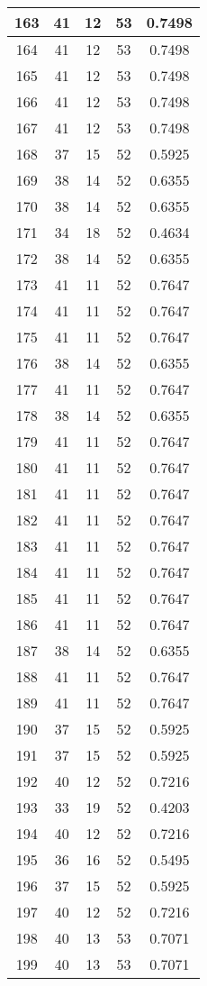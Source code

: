 \documentclass[letterpaper, 12pt]{article}
\begin{document}
\begin{longtable}{|c|c|c|c|c|}
\hline
163 & 41 & 12 & 53 & 0.7498 \\
\hline
164 & 41 & 12 & 53 & 0.7498 \\
\hline
165 & 41 & 12 & 53 & 0.7498 \\
\hline
166 & 41 & 12 & 53 & 0.7498 \\
\hline
167 & 41 & 12 & 53 & 0.7498 \\
\hline
168 & 37 & 15 & 52 & 0.5925 \\
\hline
169 & 38 & 14 & 52 & 0.6355 \\
\hline
170 & 38 & 14 & 52 & 0.6355 \\
\hline
171 & 34 & 18 & 52 & 0.4634 \\
\hline
172 & 38 & 14 & 52 & 0.6355 \\
\hline
173 & 41 & 11 & 52 & 0.7647 \\
\hline
174 & 41 & 11 & 52 & 0.7647 \\
\hline
175 & 41 & 11 & 52 & 0.7647 \\
\hline
176 & 38 & 14 & 52 & 0.6355 \\
\hline
177 & 41 & 11 & 52 & 0.7647 \\
\hline
178 & 38 & 14 & 52 & 0.6355 \\
\hline
179 & 41 & 11 & 52 & 0.7647 \\
\hline
180 & 41 & 11 & 52 & 0.7647 \\
\hline
181 & 41 & 11 & 52 & 0.7647 \\
\hline
182 & 41 & 11 & 52 & 0.7647 \\
\hline
183 & 41 & 11 & 52 & 0.7647 \\
\hline
184 & 41 & 11 & 52 & 0.7647 \\
\hline
185 & 41 & 11 & 52 & 0.7647 \\
\hline
186 & 41 & 11 & 52 & 0.7647 \\
\hline
187 & 38 & 14 & 52 & 0.6355 \\
\hline
188 & 41 & 11 & 52 & 0.7647 \\
\hline
189 & 41 & 11 & 52 & 0.7647 \\
\hline
190 & 37 & 15 & 52 & 0.5925 \\
\hline
191 & 37 & 15 & 52 & 0.5925 \\
\hline
192 & 40 & 12 & 52 & 0.7216 \\
\hline
193 & 33 & 19 & 52 & 0.4203 \\
\hline
194 & 40 & 12 & 52 & 0.7216 \\
\hline
195 & 36 & 16 & 52 & 0.5495 \\
\hline
196 & 37 & 15 & 52 & 0.5925 \\
\hline
197 & 40 & 12 & 52 & 0.7216 \\
\hline
198 & 40 & 13 & 53 & 0.7071 \\
\hline
199 & 40 & 13 & 53 & 0.7071 \\
\hline
\end{longtable}
\end{document}
